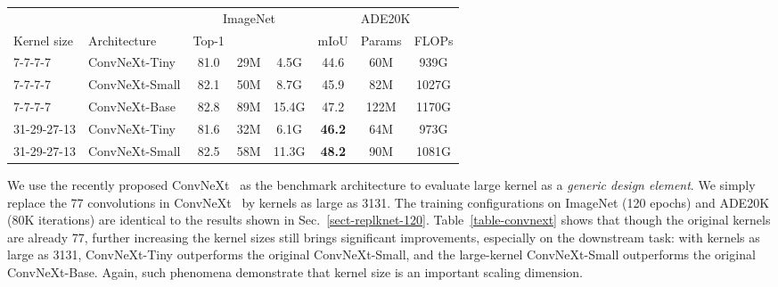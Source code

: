 \documentclass[10pt,twocolumn,letterpaper]{article}
\begin{document}
		\setlength{\tabcolsep}{3pt}
	\begin{table*}
		\caption{ConvNeXt with different kernel sizes. The models are pretrained on ImageNet-1K in 120 epochs with 224224 input and finetuned on ADE20K with UperNet in 80K iterations. On ADE20K, we test the \emph{single-scale} mIoU, and compute the FLOPs with input of 2048512, following Swin.}
		\label{table-convnext}
		\vspace{-0.25in}
		\begin{center}		
			\small
			\begin{tabular}{ll|ccc|ccc}
				\hline
				& & \multicolumn{3}{c|}{ImageNet} & \multicolumn{3}{c}{ADE20K} \\
				Kernel size 	&		Architecture		&	Top-1		& \makecell{Params}		&\makecell{FLOPs}	&	mIoU	& Params	& FLOPs	\\
				\hline
				7-7-7-7			&	ConvNeXt-Tiny	&	     81.0           &   29M       &   4.5G   &   44.6  	 	&   60M		&   939G\\
				7-7-7-7			&	ConvNeXt-Small	&	     82.1           &   50M       &   8.7G   &   45.9  	 	&   82M  	&   1027G\\
				7-7-7-7			&	ConvNeXt-Base	&	     82.8           &   89M       &   15.4G  &   47.2  	 	&   122M  	&   1170G\\
				\hline
				31-29-27-13		&	ConvNeXt-Tiny	&	     81.6           &   32M       &   6.1G   &   \textbf{46.2}  	 	&   64M  &   973G\\
				31-29-27-13		&	ConvNeXt-Small	&	     82.5           &   58M       &   11.3G  &   \textbf{48.2}  	 	&   90M  &   1081G\\
				\hline
			\end{tabular}
		\end{center}
		\vspace{-0.3in}
	\end{table*}
	
	We use the recently proposed ConvNeXt~\cite{liu2022convnet} as the benchmark architecture to evaluate large kernel as a \emph{generic design element}. We simply replace the 77 convolutions in ConvNeXt~\cite{liu2022convnet} by kernels as large as 3131. The training configurations on ImageNet (120 epochs) and ADE20K (80K iterations) are identical to the results shown in Sec.~\ref{sect-replknet-120}. Table~\ref{table-convnext} shows that though the original kernels are already 77, further increasing the kernel sizes still brings significant improvements, especially on the downstream task: with kernels as large as 3131, ConvNeXt-Tiny outperforms the original ConvNeXt-Small, and the large-kernel ConvNeXt-Small outperforms the original ConvNeXt-Base. Again, such phenomena demonstrate that kernel size is an important scaling dimension.
	
\end{document}
